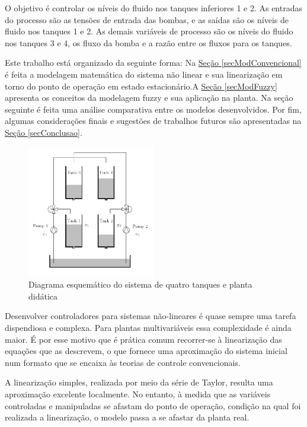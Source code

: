 O objetivo é controlar os níveis do fluido nos tanques inferiores 1 e 2. As entradas do processo são as tensões de entrada das bombas, e as saídas são os níveis de fluido nos tanques 1 e 2. As demais variáveis de processo são os níveis do fluido nos tanques 3 e 4, os fluxo da bomba e a razão entre os fluxos para os tanques. 

Este trabalho está organizado da seguinte forma: Na \hyperref[secModConvencional]{Seção \ref{secModConvencional}} é feita a modelagem matemática do sistema não linear e sua linearização em torno do ponto de operação em estado estacionário.A  \hyperref[secModFuzzy]{Seção \ref{secModFuzzy}} apresenta os conceitos da modelagem fuzzy e sua aplicação na planta. Na seção seguinte é feita uma análise comparativa entre os modelos desenvolvidos. Por fim, algumas considerações finais e sugestões de trabalhos futuros são apresentadas na \hyperref[secConclusao]{Seção \ref{secConclusao}}.

\begin{figure}
	\begin{centering}
		\includegraphics[width=0.5\textwidth]{figs/4tank.png}
		\par\end{centering}
	\caption{\label{fig:teste_fig_01}Diagrama esquemático do sistema de quatro tanques e planta didática}
\end{figure}

\indent Desenvolver controladores para sistemas não-lineares é quase sempre uma tarefa dispendiosa e complexa. Para plantas multivariáveis essa complexidade é ainda maior. É por esse motivo que é prática comum recorrer-se à linearização das equações que as descrevem, o que fornece uma aproximação do sistema inicial num formato que se encaixa às teorias de controle convencionais.

A linearização simples, realizada por meio da série de Taylor, resulta uma aproximação excelente localmente. No entanto, à medida que as variáveis controladas e manipuladas se afastam do ponto de operação, condição na qual foi realizada a linearização, o modelo passa a se afastar da planta real.

